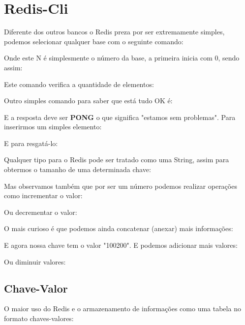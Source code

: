 \section{Redis-Cli}
Diferente dos outros bancos o Redis preza por ser extremamente simples, podemos selecionar qualquer base com o seguinte comando: \\

Onde este N é simplesmente o número da base, a primeira inicia com 0, sendo assim: \\

Este comando verifica a quantidade de elementos: \\

Outro simples comando para saber que está tudo OK é: \\

E a resposta deve ser \textbf{PONG} o que significa "estamos sem problemas". Para inserirmos um simples elemento: \\

E para resgatá-lo: \\

Qualquer tipo para o Redis pode ser tratado como uma String, assim para obtermos o tamanho de uma determinada chave: \\

Mas observamos também que por ser um número podemos realizar operações como incrementar o valor: \\

Ou decrementar o valor: \\

O mais curioso é que podemos ainda concatenar (anexar) mais informações: \\

E agora nossa chave tem o valor "100200". E podemos adicionar mais valores: \\

Ou diminuir valores: \\

\subsection{Chave-Valor}
O maior uso do Redis e o armazenamento de informações como uma tabela no formato chaves-valores: \\

